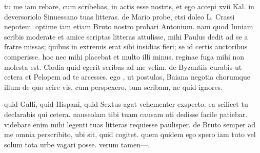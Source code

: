 


 tu me iam rebare, cum scribebas, in actis esse nostris, et ego accepi xvii Kal. in deversoriolo Sinuessano tuas litteras. de Mario probe, etsi doleo L. Crassi nepotem. optime iam etiam Bruto nostro probari Antonium. nam quod Iuniam scribis moderate et amice scriptas litteras attulisse, mihi Paulus dedit ad se a fratre missas; quibus in extremis erat sibi insidias fieri; se id certis auctoribus comperisse. hoc nec mihi placebat et multo illi minus. reginae fuga mihi non molesta est. Clodia quid egerit scribas ad me velim. de Byzantiis curabis ut cetera et Pelopem ad te arcesses. ego , ut postulas, Baiana negotia chorumque illum de quo scire vis, cum perspexero, tum scribam, ne quid ignores.

 quid Galli, quid Hispani, quid Sextus agat vehementer exspecto. ea scilicet tu declarabis qui cetera. nauseolam tibi tuam causam oti dedisse facile patiebar. videbare enim mihi legenti tuas litteras requiesse paulisper. de Bruto semper ad me omnia perscribito, ubi sit, quid cogitet. quem quidem ego spero iam tuto vel solum tota urbe vagari posse. verum tamen—.

